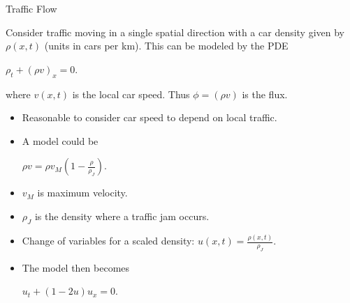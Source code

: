 \documentclass[t,10pt,fleqn]{beamer}
\def\ds{\displaystyle}
\begin{document}
\begin{frame}
\pause
\begin{block}{Traffic Flow}

Consider traffic moving in a single spatial direction with a car density given by $\rho(x,t)$ (units in cars per km).  This can be modeled by the PDE  
\begin{center}
$\rho_t + (\rho v)_x =0 $.
\end{center}
where $v(x,t)$ is the local car speed.  Thus $\phi = (\rho v)$ is the flux. \pause

\begin{itemize}
      \item Reasonable to consider car speed to depend on local traffic.  \pause
      \item A model could be
      \begin{center}
                 $\rho v =  \rho v_M (1 - \frac{\rho}{\rho_J})  $.
        \end{center}
        \pause
        \item $v_M$ is maximum velocity.  \pause
         \pause
        \item $\rho_J$ is the density where a traffic jam occurs.  
                 \pause
        \item Change of variables for a scaled density:  $ u(x,t) =\ds  \frac{\rho(x,t)}{\rho_J}$.  
         \pause
              \item The model then becomes
      \begin{center}
                 $u_t+ (1-2u) u_x = 0 $.
        \end{center}
\end{itemize}

\end{block}






\end{frame}

\end{document}
